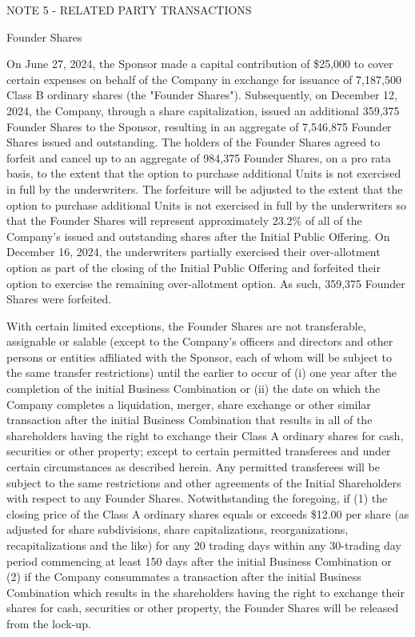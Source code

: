 \documentclass[11pt,a4paper]{article}
\begin{document}
NOTE 5 - RELATED PARTY TRANSACTIONS

Founder Shares

On June 27, 2024, the Sponsor made a capital contribution of \$25,000 to cover certain expenses on behalf of the Company in exchange for issuance of 7,187,500 Class B ordinary shares (the "Founder Shares"). Subsequently, on December 12, 2024, the Company, through a share capitalization, issued an additional 359,375 Founder Shares to the Sponsor, resulting in an aggregate of 7,546,875 Founder Shares issued and outstanding. The holders of the Founder Shares agreed to forfeit and cancel up to an aggregate of 984,375 Founder Shares, on a pro rata basis, to the extent that the option to purchase additional Units is not exercised in full by the underwriters. The forfeiture will be adjusted to the extent that the option to purchase additional Units is not exercised in full by the underwriters so that the Founder Shares will represent approximately 23.2\% of all of the Company's issued and outstanding shares after the Initial Public Offering. On December 16, 2024, the underwriters partially exercised their over-allotment option as part of the closing of the Initial Public Offering and forfeited their option to exercise the remaining over-allotment option. As such, 359,375 Founder Shares were forfeited.

With certain limited exceptions, the Founder Shares are not transferable, assignable or salable (except to the Company's officers and directors and other persons or entities affiliated with the Sponsor, each of whom will be subject to the same transfer restrictions) until the earlier to occur of (i) one year after the completion of the initial Business Combination or (ii) the date on which the Company completes a liquidation, merger, share exchange or other similar transaction after the initial Business Combination that results in all of the shareholders having the right to exchange their Class A ordinary shares for cash, securities or other property; except to certain permitted transferees and under certain circumstances as described herein. Any permitted transferees will be subject to the same restrictions and other agreements of the Initial Shareholders with respect to any Founder Shares. Notwithstanding the foregoing, if (1) the closing price of the Class A ordinary shares equals or exceeds \$12.00 per share (as adjusted for share subdivisions, share capitalizations, reorganizations, recapitalizations and the like) for any 20 trading days within any 30-trading day period commencing at least 150 days after the initial Business Combination or (2) if the Company consummates a transaction after the initial Business Combination which results in the shareholders having the right to exchange their shares for cash, securities or other property, the Founder Shares will be released from the lock-up.
\end{document}
